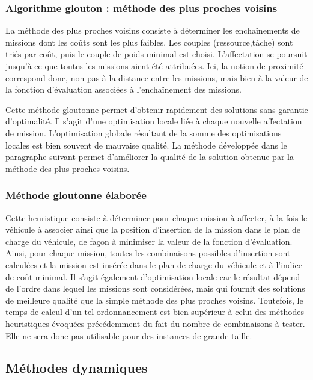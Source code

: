 \subsubsection{Algorithme glouton : méthode des plus proches voisins}\label{chap:ordo:sec:resolution:subsec:heuristiques:glouton}

La méthode des plus proches voisins consiste à déterminer les enchaînements de missions dont les coûts sont les plus faibles. Les couples (ressource,tâche) sont triés par coût, puis le couple de poids minimal est choisi. L'affectation se poursuit jusqu'à ce que toutes les missions aient été attribuées. Ici, la notion de proximité correspond donc, non pas à la distance entre les missions, mais bien à la valeur de la fonction d'évaluation associées à l'enchaînement des missions.

Cette méthode gloutonne permet d'obtenir rapidement des solutions sans garantie d'optimalité. Il s'agit d'une optimisation locale liée à chaque nouvelle affectation de mission. L'optimisation globale résultant de la somme des optimisations locales est bien souvent de mauvaise qualité. La méthode développée dans le paragraphe suivant permet d'améliorer la qualité de la solution obtenue par la méthode des plus proches voisins.

\subsubsection{Méthode gloutonne élaborée}\label{chap:ordo:reso:greedyOpt}

Cette heuristique consiste à déterminer pour chaque mission à affecter, à la fois le véhicule à associer ainsi que la position d'insertion de la mission dans le plan de charge du véhicule, de façon à minimiser la valeur de la fonction d'évaluation. Ainsi, pour chaque mission, toutes les combinaisons possibles d'insertion sont calculées et la mission est insérée dans le plan de charge du véhicule et à l'indice de coût minimal.
Il s'agit également d'optimisation locale car le résultat dépend de l'ordre dans lequel les missions sont considérées, mais qui fournit des solutions de meilleure qualité que la simple méthode des plus proches voisins.
Toutefois, le temps de calcul d'un tel ordonnancement est bien supérieur à celui des méthodes heuristiques évoquées précédemment du fait du nombre de combinaisons à tester.
Elle ne sera donc pas utilisable pour des instances de grande taille.


\subsection{Méthodes dynamiques}

